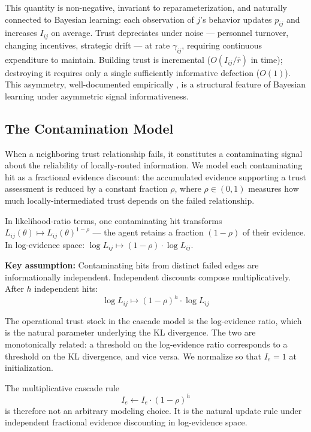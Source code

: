 \documentclass[11pt,a4paper]{article}
\begin{document}
This quantity is non-negative, invariant to reparameterization, and naturally connected to Bayesian learning: each observation of $j$'s behavior updates $p_{ij}$ and increases $I_{ij}$ on average. Trust depreciates under noise --- personnel turnover, changing incentives, strategic drift --- at rate $\gamma_{ij}$, requiring continuous expenditure to maintain. Building trust is incremental ($O(I_{ij}/\bar{r})$ in time); destroying it requires only a single sufficiently informative defection ($O(1)$). This asymmetry, well-documented empirically \cite{slovic1993,kramer1999}, is a structural feature of Bayesian learning under asymmetric signal informativeness.

\subsection{The Contamination Model}

When a neighboring trust relationship fails, it constitutes a contaminating signal about the reliability of locally-routed information. We model each contaminating hit as a fractional evidence discount: the accumulated evidence supporting a trust assessment is reduced by a constant fraction $\rho$, where $\rho \in (0,1)$ measures how much locally-intermediated trust depends on the failed relationship.

In likelihood-ratio terms, one contaminating hit transforms $L_{ij}(\theta) \mapsto L_{ij}(\theta)^{1-\rho}$ --- the agent retains a fraction $(1-\rho)$ of their evidence. In log-evidence space: $\log L_{ij} \mapsto (1-\rho) \cdot \log L_{ij}$.

\textbf{Key assumption:} Contaminating hits from distinct failed edges are informationally independent. Independent discounts compose multiplicatively. After $h$ independent hits:
\begin{equation}
\log L_{ij} \mapsto (1-\rho)^h \cdot \log L_{ij}
\label{eq:logevidence}
\end{equation}

The operational trust stock in the cascade model is the log-evidence ratio, which is the natural parameter underlying the KL divergence. The two are monotonically related: a threshold on the log-evidence ratio corresponds to a threshold on the KL divergence, and vice versa. We normalize so that $I_e = 1$ at initialization.

The multiplicative cascade rule
\begin{equation}
I_e \leftarrow I_e \cdot (1-\rho)^h
\label{eq:cascade_rule}
\end{equation}
is therefore not an arbitrary modeling choice. It is the natural update rule under independent fractional evidence discounting in log-evidence space.
\end{document}
